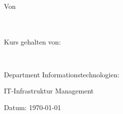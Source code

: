 

\begin{titlepage}
\begin{center}
    \vspace*{-5,7cm}
    \hspace*{-1,45cm}
    
    \vspace{2.3cm}
    

    \vspace{1cm}
    {\textbf{\Titel\\}}
    \vspace{2.4cm}
    
    {} \\
    \vspace{0.5cm}
    {}\\
    \vspace{0.5cm}
    Von\\
    \SchuelerName \\ \SchuelerPKZ\\
    \vspace{0.9cm}
    {\begin{singlespace}Kurs gehalten von:\\\end{singlespace}}
    {\begin{singlespace}\Lehrer\\\end{singlespace}}


\end{center}
{\raggedleft\vfill{\begin{singlespace}
     Department Informationstechnologien:\\
\end{singlespace}
 IT-Infrastruktur Management\\
 \begin{singlespace}
 Datum: \today\\
 
 
 \end{singlespace}
}\par
}
\end{titlepage}
